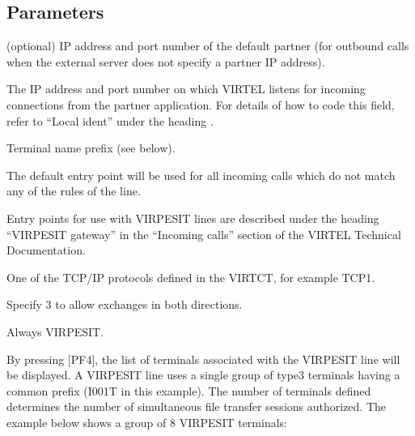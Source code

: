 \documentclass[letterpaper,10pt,english]{sphinxmanual}
\begin{document}
\subsection{Parameters}
\label{\detokenize{connectivity_guide:index-56}}\label{\detokenize{connectivity_guide:id24}}\begin{description}
\sphinxAtStartPar
(optional) IP address and port number of the default partner (for outbound calls when the external server does not specify a partner IP address).

\sphinxAtStartPar
The IP address and port number on which VIRTEL listens for incoming connections from the partner application. For details of how to code this field, refer to “Local ident” under the heading .

\sphinxAtStartPar
Terminal name prefix (see below).

\sphinxAtStartPar
The default entry point will be used for all incoming calls which do not match any of the rules of the line.

\sphinxAtStartPar
Entry points for use with VIRPESIT lines are described under the heading “VIRPESIT gateway” in the “Incoming calls” section of the VIRTEL Technical Documentation.

\sphinxAtStartPar
One of the TCP/IP protocols defined in the VIRTCT, for example TCP1.

\sphinxAtStartPar
Specify 3 to allow exchanges in both directions.

\sphinxAtStartPar
Always VIRPESIT.

\end{description}

\sphinxAtStartPar
By pressing {[}PF4{]}, the list of terminals associated with the VIRPESIT line will be displayed. A VIRPESIT line uses a single group of type\sphinxhyphen{}3 terminals having a common prefix (I001T in this example). The number of terminals defined determines the number of simultaneous file transfer sessions authorized. The example below shows a group of 8 VIRPESIT terminals:

\sphinxAtStartPar
{}

\ignorespaces 
\end{document}
